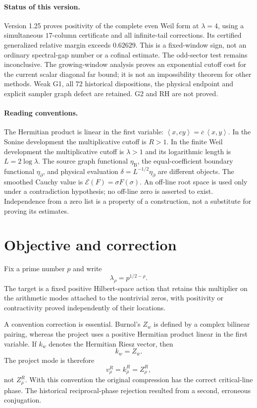 \documentclass[11pt]{article}
\theoremstyle{remark}
\newcommand{\ip}[2]{\left\langle #1,#2\right\rangle}
\begin{document}
\paragraph{Status of this version.}
Version 1.25 proves positivity of the complete even Weil form at
$\lambda=4$, using a simultaneous $17$-column certificate and all
infinite-tail corrections. Its certified generalized relative margin
exceeds $0.62629$. This is a fixed-window sign, not an ordinary
spectral-gap number or a cofinal estimate. The odd-sector test remains
inconclusive. The growing-window analysis proves an exponential
cutoff cost for the current scalar diagonal far bound; it is not
an impossibility theorem for other methods. Weak G1, all 72 historical
dispositions, the physical endpoint and explicit sampler graph defect
are retained. G2 and RH are not proved.

\paragraph{Reading conventions.}
The Hermitian product is linear in the first variable:
$\ip{x}{cy}=\overline c\,\ip{x}{y}$.
In the Sonine development the multiplicative cutoff is $R>1$.
In the finite Weil development the multiplicative cutoff is $\lambda>1$
and its logarithmic length is $L=2\log\lambda$.
The source graph functional $\eta_{\mathrm B}$, the equal-coefficient
boundary functional $\eta_\partial$, and physical evaluation
$\delta=L^{-1/2}\eta_\partial$ are different objects.
The smoothed Cauchy value is $\mathscr E(F)=\sigma F(\sigma)$.
An off-line root space is used only under a contradiction hypothesis;
no off-line zero is asserted to exist. Independence from a zero list is
a property of a construction, not a substitute for proving its estimates.

\clearpage
\tableofcontents
\clearpage
\section{Objective and correction}
Fix a prime number $p$ and write
\[
  \lambda_\rho=p^{1/2-\rho}.
\]
The target is a fixed positive Hilbert-space action that retains this multiplier on the arithmetic modes attached to the nontrivial zeros, with positivity or contractivity proved independently of their locations.

A convention correction is essential. Burnol's $Z_w$ is defined by a complex bilinear pairing, whereas the project uses a positive Hermitian product linear in the first variable. If $k_w$ denotes the Hermitian Riesz vector, then
\[
  k_w=Z_{\bar w}.
\]
The project mode is therefore
\[
  v_\rho^R=k_{\bar\rho}^R=Z_\rho^R,
\]
not $Z_{\bar\rho}^R$. With this convention the original compression has the correct critical-line phase. The historical reciprocal-phase rejection resulted from a second, erroneous conjugation.
\end{document}
